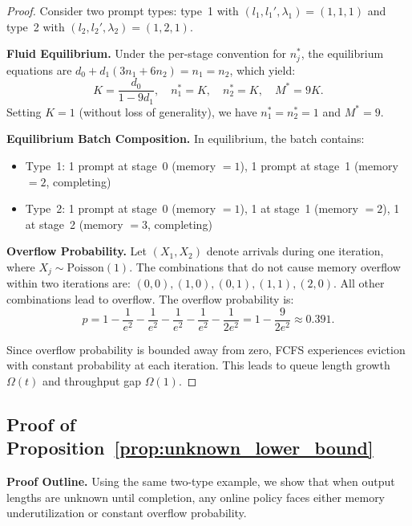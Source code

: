 \begin{proof}
Consider two prompt types: type~1 with $(l_1, l_1', \lambda_1) = (1, 1, 1)$ and type~2 with $(l_2, l_2', \lambda_2) = (1, 2, 1)$.

\textbf{Fluid Equilibrium.} Under the per-stage convention for \(n_j^*\), the equilibrium equations are \(d_0 + d_1(3n_1 + 6n_2) = n_1 = n_2\), which yield:
$$K = \frac{d_0}{1-9d_1}, \quad n_1^* = K, \quad n_2^* = K, \quad M^* = 9K.$$
Setting $K = 1$ (without loss of generality), we have $n_1^* = n_2^* = 1$ and $M^* = 9$.

\textbf{Equilibrium Batch Composition.} In equilibrium, the batch contains:
\begin{itemize}
\item Type~1: 1 prompt at stage~0 (memory $= 1$), 1 prompt at stage~1 (memory $= 2$, completing)
\item Type~2: 1 prompt at stage~0 (memory $= 1$), 1 at stage~1 (memory $= 2$), 1 at stage~2 (memory $= 3$, completing)
\end{itemize}

\textbf{Overflow Probability.} Let $(X_1, X_2)$ denote arrivals during one iteration, where $X_j \sim \text{Poisson}(1)$. The combinations that do not cause memory overflow within two iterations are: $(0,0), (1,0), (0,1), (1,1), (2,0)$. All other combinations lead to overflow. The overflow probability is:
$$p = 1 - \frac{1}{e^2} - \frac{1}{e^2} - \frac{1}{e^2} - \frac{1}{e^2} - \frac{1}{2e^2} = 1 - \frac{9}{2e^2} \approx 0.391.$$

Since overflow probability is bounded away from zero, FCFS experiences eviction with constant probability at each iteration. This leads to queue length growth $\Omega(t)$ and throughput gap $\Omega(1)$.
\end{proof}

\subsection{Proof of Proposition~\ref{prop:unknown_lower_bound}}
\label{appendix:proof_unknown_lower_bound}

\noindent\textbf{Proof Outline.} Using the same two-type example, we show that when output lengths are unknown until completion, any online policy faces either memory underutilization or constant overflow probability.

